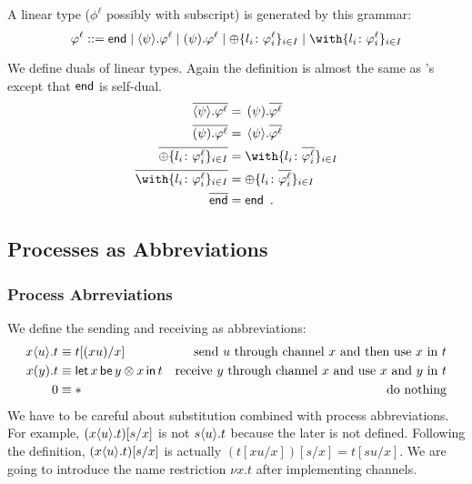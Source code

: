     A linear type ($\phi^\ell$ possibly with subscript) is generated by
    this grammar:
    \[
     \phi^\ell ::= \terminate\mid
     \sendtype{\psi}{\phi^\ell} \mid
     \recvtype{\psi}{\phi^\ell}
     \mid \oplus\{l_i\colon\phi^\ell_i\}_{i\in I}
     \mid \with\{l_i\colon\phi^\ell_i\}_{i\in I}
    \]

    We define duals of linear types.
    Again the definition is almost the
    same as \citet{wadler2012propositions}'s except that $\mathsf{end}$ is
    self-dual.
    \begin{align*}
     \overline{\sendtype\psi{\phi^\ell}}&= \,\recvtype\psi{\overline{\phi^\ell}}\\
     \overline{\recvtype\psi{\phi^\ell}}&= \,\sendtype\psi{\overline{\phi^\ell}}\\
     \overline{\oplus\{l_i\colon \phi^\ell_i\}_{i\in I}} &=
     \with\{l_i\colon \overline{\phi^\ell_i}\}_{i\in I} \\
     \overline{\with\{l_i\colon \phi^\ell_i\}_{i\in I}} &=
     \oplus\{l_i\colon \overline{\phi^\ell_i}\}_{i\in I} \\
     \overline{\terminate} &= \terminate\enspace.
    \end{align*}

    \subsection{Processes as Abbreviations}

    \subsubsection{Process Abrreviations}
    We define the sending and receiving as abbreviations:
    \begin{align*}
     {x}\langle{u}\rangle.{t} &\equiv t[(xu) /x] &\text{send $u$ through channel
     $x$ and then use $x$ in $t$} \\
     {{x}({y}).{t}} &\equiv \mathsf{let }\,{x}\,\mathsf{ be }\,{y\otimes x}\,\mathsf{ in }\,{t} & \text{receive
     $y$ through channel $x$ and use $x$ and $y$ in $t$} \\
     0 &\equiv \ast &\text{do nothing}
    \end{align*}
    We have to be careful about substitution combined with process
    abbreviations.
    For example, $({x}\langle{u}\rangle.{t})[s/x]$ is not ${s}\langle{u}\rangle.{t}$
    because the later is not defined.  Following the definition,
    $({x}\langle{u}\rangle.{t})[s/x]$ is actually $(t[xu/x])[s/x] = t[su/x]$.
    We are going to introduce the name restriction $\nu x.t$ after
    implementing channels.


